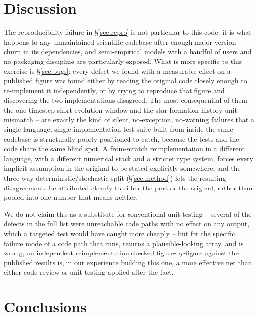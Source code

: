 \documentclass[fleqn,usenatbib]{mnras}
\begin{document}
\section{Discussion}
\label{sec:discuss}

The reproducibility failure in \S\ref{sec:repro} is not particular to
this code; it is what happens to any unmaintained scientific codebase
after enough major-version churn in its dependencies, and semi-empirical
models with a handful of users and no packaging discipline are
particularly exposed. What is more specific to this exercise is
\S\ref{sec:bugs}: every defect we found with a measurable effect on a
published figure was found either by reading the original code closely
enough to re-implement it independently, or by trying to reproduce that
figure and discovering the two implementations disagreed. The most
consequential of them -- the one-timestep-short evolution window and the
star-formation-history unit mismatch -- are exactly the kind of silent,
no-exception, no-warning failures that a single-language,
single-implementation test suite built from inside the same codebase is
structurally poorly positioned to catch, because the tests and the code
share the same blind spot. A from-scratch reimplementation in a
different language, with a different numerical stack and a stricter type
system, forces every implicit assumption in the original to be stated
explicitly somewhere, and the three-way deterministic/stochastic split
(\S\ref{sec:method}) lets the resulting disagreements be attributed
cleanly to either the port or the original, rather than pooled into one
number that means neither.

We do not claim this as a substitute for conventional unit testing --
several of the defects in the full list were unreachable code paths with
no effect on any output, which a targeted test would have caught more
cheaply -- but for the specific failure mode of a code path that runs,
returns a plausible-looking array, and is wrong, an independent
reimplementation checked figure-by-figure against the published results
is, in our experience building this one, a more effective net than
either code review or unit testing applied after the fact.

\section{Conclusions}
\end{document}
